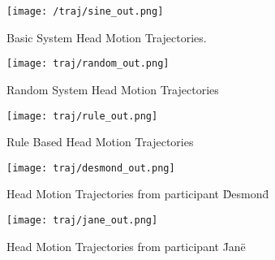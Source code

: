
\begin{figure}
\caption{Basic System Head Motion Trajectories.}
\texttt{[image: /traj/sine\_out.png]}
\end{figure}

\begin{figure}
\caption{Random System Head Motion Trajectories}
\texttt{[image: traj/random\_out.png]}
\end{figure}

\begin{figure}
\caption{Rule Based Head Motion Trajectories}
\texttt{[image: traj/rule\_out.png]}
\end{figure}

\begin{figure}
\caption{Head Motion Trajectories from participant \"Desmond\"}
\texttt{[image: traj/desmond\_out.png]}
\end{figure}

\begin{figure}
\caption{Head Motion Trajectories from participant \"Jane\"}
\texttt{[image: traj/jane\_out.png]}
\end{figure}

